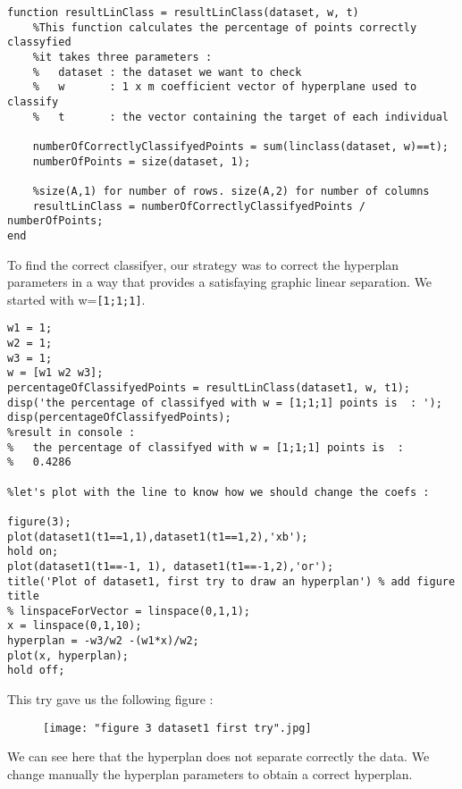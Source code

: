 \documentclass[a4paper]{article}
\begin{document}
\begin{lstlisting}[frame=single]
function resultLinClass = resultLinClass(dataset, w, t)
	%This function calculates the percentage of points correctly classyfied
	%it takes three parameters : 
	%	dataset : the dataset we want to check
	%	w 		: 1 x m coefficient vector of hyperplane used to classify
	%	t 		: the vector containing the target of each individual
		
	numberOfCorrectlyClassifyedPoints = sum(linclass(dataset, w)==t);
	numberOfPoints = size(dataset, 1);
	
	%size(A,1) for number of rows. size(A,2) for number of columns
	resultLinClass = numberOfCorrectlyClassifyedPoints / numberOfPoints;
end
\end{lstlisting} 
	\pagebreak
	To find the correct classifyer, our strategy was to correct the hyperplan parameters in a way that provides a satisfaying graphic linear separation. We started with w=\verb![1;1;1]!.
\begin{lstlisting}[frame=single]
w1 = 1;
w2 = 1;
w3 = 1;
w = [w1 w2 w3];
percentageOfClassifyedPoints = resultLinClass(dataset1, w, t1);
disp('the percentage of classifyed with w = [1;1;1] points is  : ');
disp(percentageOfClassifyedPoints);
%result in console : 
%	the percentage of classifyed with w = [1;1;1] points is  : 
%	0.4286

%let's plot with the line to know how we should change the coefs :

figure(3);
plot(dataset1(t1==1,1),dataset1(t1==1,2),'xb');
hold on;
plot(dataset1(t1==-1, 1), dataset1(t1==-1,2),'or');
title('Plot of dataset1, first try to draw an hyperplan') % add figure title
% linspaceForVector = linspace(0,1,1);
x = linspace(0,1,10);
hyperplan = -w3/w2 -(w1*x)/w2;
plot(x, hyperplan);
hold off;
\end{lstlisting}
	
	This try gave us the following figure :
	\begin{center}
		\begin{figure}[h]
			\begin{center}
				\texttt{[image: "figure 3 dataset1 first try".jpg]}
			\end{center}
		\end{figure}
	\end{center}

	We can see here that the hyperplan does not separate correctly the data.
	We change manually the hyperplan parameters to obtain a correct hyperplan.
	
\end{document}
